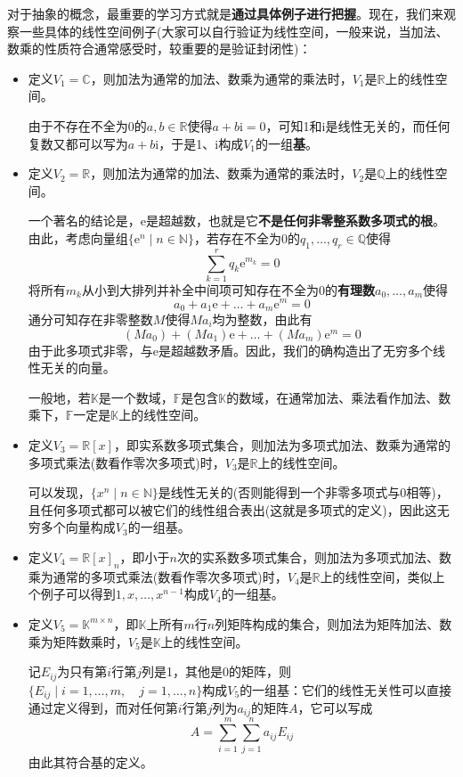 \documentclass[a4paper,UTF8,fontset=windows,AutoFakeBold]{ctexart}
\newcommand*{\er}{\mathrm{e}}
\newcommand*{\ir}{\mathrm{i}}
\newcommand*{\note}{\noindent *}
\begin{document}
对于抽象的概念，最重要的学习方式就是\textbf{通过具体例子进行把握}。现在，我们来观察一些具体的线性空间例子(大家可以自行验证为线性空间，一般来说，当加法、数乘的性质符合通常感受时，较重要的是验证封闭性)：
\begin{itemize}
    \item 定义$V_1=\mathbb{C}$，则加法为通常的加法、数乘为通常的乘法时，$V_1$是$\mathbb{R}$上的线性空间。
    
    由于不存在不全为0的$a,b\in\mathbb{R}$使得$a+b\ir=0$，可知1和$\ir$是线性无关的，而任何复数又都可以写为$a+b\ir$，于是1、$\ir$构成$V_1$的一组\textbf{基}。

    \item 定义$V_2=\mathbb{R}$，则加法为通常的加法、数乘为通常的乘法时，$V_2$是$\mathbb{Q}$上的线性空间。
    
    一个著名的结论是，$\er$是超越数，也就是它\textbf{不是任何非零整系数多项式的根}。由此，考虑向量组$\{\er^n\mid n\in\mathbb{N}\}$，若存在不全为0的$q_1,\dots,q_r\in\mathbb{Q}$使得
    $$\sum_{k=1}^rq_k\er^{m_k}=0$$
    将所有$m_k$从小到大排列并补全中间项可知存在不全为0的\textbf{有理数}$a_0,\dots,a_m$使得
    $$a_0+a_1\er+\dots+a_m\er^m=0$$
    通分可知存在非零整数$M$使得$Ma_i$均为整数，由此有
    $$(Ma_0)+(Ma_1)\er+\dots+(Ma_m)\er^m=0$$
    由于此多项式非零，与$\er$是超越数矛盾。因此，我们的确构造出了无穷多个线性无关的向量。

    \note 一般地，若$\mathbb{K}$是一个数域，$\mathbb{F}$是包含$\mathbb{K}$的数域，在通常加法、乘法看作加法、数乘下，$\mathbb{F}$一定是$\mathbb{K}$上的线性空间。

    \item 定义$V_3=\mathbb{R}[x]$，即实系数多项式集合，则加法为多项式加法、数乘为通常的多项式乘法(数看作零次多项式)时，$V_3$是$\mathbb{R}$上的线性空间。
    
    可以发现，$\{x^n\mid n\in\mathbb{N}\}$是线性无关的(否则能得到一个非零多项式与0相等)，且任何多项式都可以被它们的线性组合表出(这就是多项式的定义)，因此这无穷多个向量构成$V_3$的一组基。

    \item 定义$V_4=\mathbb{R}[x]_n$，即小于$n$次的实系数多项式集合，则加法为多项式加法、数乘为通常的多项式乘法(数看作零次多项式)时，$V_4$是$\mathbb{R}$上的线性空间，类似上个例子可以得到$1,x,\dots,x^{n-1}$构成$V_4$的一组基。
    
    \item 定义$V_5=\mathbb{K}^{m\times n}$，即$\mathbb{K}$上所有$m$行$n$列矩阵构成的集合，则加法为矩阵加法、数乘为矩阵数乘时，$V_5$是$\mathbb{K}$上的线性空间。
    
    记$E_{ij}$为只有第$i$行第$j$列是1，其他是0的矩阵，则$\{E_{ij}\mid i=1,\dots,m,\quad j=1,\dots,n\}$构成$V_5$的一组基：它们的线性无关性可以直接通过定义得到，而对任何第$i$行第$j$列为$a_{ij}$的矩阵$A$，它可以写成
    $$A=\sum_{i=1}^m\sum_{j=1}^na_{ij}E_{ij}$$
    由此其符合基的定义。
\end{itemize}
\end{document}
